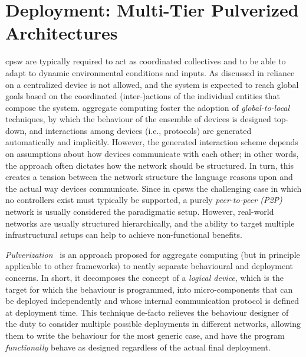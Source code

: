 \chapter{Deployment: Multi-Tier Pulverized Architectures}\label{chap:eng:multitier}%
\minitoc%
%
\newcommand{\scalaloci}{{ScalaLoci}}
\newcommand{\scafiloci}{{ScaFiLoci}}
\newcommand{\scalainline}[1]{\texttt{#1}}
\ac{cpsw} are typically required 
 to act as coordinated collectives
 and to be able to adapt to dynamic
 environmental conditions and inputs.
%
%
As discussed in  reliance on a centralized device is not allowed,
and the system is expected to reach global goals based 
 on the coordinated (inter-)actions of the individual entities that compose the system.
aggregate computing foster the adoption of \emph{global-to-local} techniques,
by which the behaviour of the ensemble of devices is designed top-down,
and interactions among devices (i.e., protocols) are generated automatically and implicitly.
%
However, the generated interaction scheme depends on assumptions about how devices communicate with each other;
in other words, the approach often dictates how the network should be structured.
%
In turn, this creates a tension between the network structure the language reasons upon and the actual way devices communicate.
%
Since in \acp{cpsw} the challenging case in which no controllers exist must typically be supported, 
 a purely \emph{peer-to-peer (P2P)} network is usually considered the paradigmatic setup.
%
However, real-world networks are usually structured hierarchically, 
 and the ability to target multiple infrastructural setups can help to achieve non-functional benefits.

\emph{Pulverization}~\cite{DBLP:journals/fi/CasadeiPPVW20}
 is an approach proposed for aggregate computing 
 (but in principle applicable to other frameworks) 
 to neatly separate behavioural and deployment concerns.
%
In short, it decomposes the concept of a \emph{logical device}, 
 which is the target for which the behaviour is programmed,
 into micro-components that can be deployed independently
 and whose internal communication protocol is defined at deployment time.
%
This technique de-facto relieves the behaviour designer of the duty 
 to consider multiple possible  deployments in different networks, 
 allowing them to write the behaviour for the most generic case, 
 and have the program \emph{functionally} behave as designed regardless of the actual final deployment.


